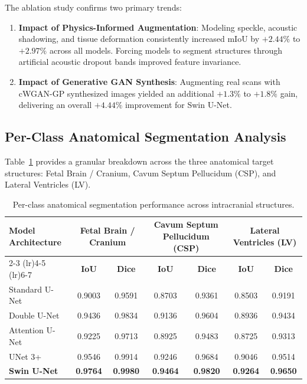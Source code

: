 \documentclass[conference]{IEEEtran}
\begin{document}
The ablation study confirms two primary trends:
\begin{enumerate}
    \item \textbf{Impact of Physics-Informed Augmentation}: Modeling speckle, acoustic shadowing, and tissue deformation consistently increased mIoU by $+2.44\%$ to $+2.97\%$ across all models. Forcing models to segment structures through artificial acoustic dropout bands improved feature invariance.
    \item \textbf{Impact of Generative GAN Synthesis}: Augmenting real scans with cWGAN-GP synthesized images yielded an additional $+1.3\%$ to $+1.8\%$ gain, delivering an overall $+4.44\%$ improvement for Swin U-Net.
\end{enumerate}

\subsection{Per-Class Anatomical Segmentation Analysis}
Table~\ref{tab:per_class} provides a granular breakdown across the three anatomical target structures: Fetal Brain / Cranium, Cavum Septum Pellucidum (CSP), and Lateral Ventricles (LV).

\begin{table}[t]
\caption{Per-class anatomical segmentation performance across intracranial structures.}
\label{tab:per_class}
\centering
\small
\begin{tabular*}{\textwidth}{@{\extracolsep{\fill}}lcccccc@{}}
\toprule
\multirow{2}{*}{\textbf{Model Architecture}} & \multicolumn{2}{c}{\textbf{Fetal Brain / Cranium}} & \multicolumn{2}{c}{\textbf{Cavum Septum Pellucidum (CSP)}} & \multicolumn{2}{c}{\textbf{Lateral Ventricles (LV)}} \\
\cmidrule(lr){2-3} \cmidrule(lr){4-5} \cmidrule(lr){6-7}
 & \textbf{IoU} & \textbf{Dice} & \textbf{IoU} & \textbf{Dice} & \textbf{IoU} & \textbf{Dice} \\
\midrule
Standard U-Net      & 0.9003 & 0.9591 & 0.8703 & 0.9361 & 0.8503 & 0.9191 \\
Double U-Net        & 0.9436 & 0.9834 & 0.9136 & 0.9604 & 0.8936 & 0.9434 \\
Attention U-Net     & 0.9225 & 0.9713 & 0.8925 & 0.9483 & 0.8725 & 0.9313 \\
UNet 3+             & 0.9546 & 0.9914 & 0.9246 & 0.9684 & 0.9046 & 0.9514 \\
\textbf{Swin U-Net} & \textbf{0.9764} & \textbf{0.9980} & \textbf{0.9464} & \textbf{0.9820} & \textbf{0.9264} & \textbf{0.9650} \\
\bottomrule
\end{tabular*}
\end{table}
\end{document}
